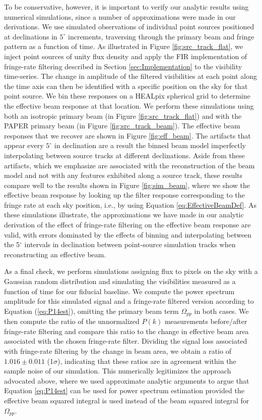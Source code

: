 \documentclass[twocolumn,apj,numberedappendix]{emulateapj}
\begin{document}
To be conservative, however, it is important to verify our analytic results using numerical
simulations, since a number of approximations were made in our derivations. We use simulated observations 
of individual point sources positioned at declinations in $5^\circ$ increments, traversing
through the primary beam and fringe pattern as a function of time.  As
illustrated in Figure \ref{fig:src_track_flat}, we inject point sources of unity
flux density and apply the FIR implementation of fringe-rate filtering described in Section \ref{sec:Implementation}
to the visibility time-series.  The change in amplitude of the filtered visibilities at each point
along the time axis can then be 
identified with a specific position on the sky for that point source.  We bin these responses on a
HEALpix spherical grid \citep{gorski_et_al2005} to determine the effective beam response
at that location.  We perform these simulations using both an isotropic primary beam (in Figure \ref{fig:src_track_flat})
and with the PAPER primary beam (in Figure \ref{fig:src_track_beam}).  
The effective beam responses that
we recover are shown in Figure \ref{fig:eff_beam}.  The artifacts 
that appear every $5^\circ$ in declination are a result the binned beam model imperfectly 
interpolating between source tracks at different
declinations.  Aside from these artifacts, which we emphasize are associated with the reconstruction of
the beam model and not with any features exhibited along a source track, 
these results compare well to the results shown in Figure \ref{fig:sim_beam}, 
where we show the effective beam response by looking up the filter response corresponding
to the fringe rate at each sky position, i.e., by using Equation \eqref{eq:EffectiveBeamDef}.  
As these simulations illustrate, the approximations we have made in our analytic
derivation of the effect of fringe-rate filtering on the effective beam response are valid, with errors 
dominated by the effects of binning and interpolating between the 5$^\circ$ intervals in declination
between point-source simulation tracks when reconstructing an effective beam.

As a final check, we perform simulations assigning flux to pixels on the sky with a Gaussian random distribution
and simulating the visibilities measured as a function of time for our fiducial baseline.  We compute the
power spectrum amplitude for this simulated signal and a fringe-rate filtered version according to
Equation (\ref{eq:P14est}), omitting the primary beam term $\Omega_{pp}$ in both cases.  We then compute
the ratio of the unnormalized $P(k)$ measurements before/after fringe-rate filtering and compare 
this ratio to the change in effective
beam area associated with the chosen fringe-rate filter.  Dividing the signal loss associated with
fringe-rate filtering by the change in beam area, we obtain a ratio of $1.016\pm0.011$ (1$\sigma$), 
indicating that these ratios are in agreement 
within the sample noise of our simulation. This numerically legitimizes the approach advocated above, where
we used approximate analytic arguments to argue that Equation \eqref{eq:P14est} can be used for power spectrum estimation provided the effective beam
squared integral is used instead of the beam squared integral for $\Omega_{pp}$.
\end{document}
